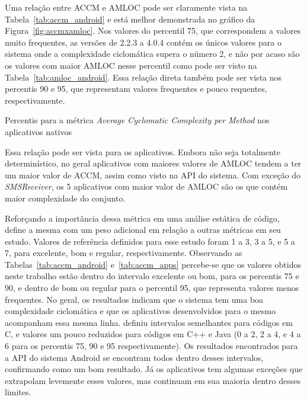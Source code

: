 Uma relação entre ACCM e AMLOC pode ser claramente vista na Tabela~\ref{tab:accm_android} e está melhor demonstrada no gráfico da Figura~\ref{fig:accmxamloc}. Nos valores do percentil 75, que correspondem a valores muito frequentes, as versões de 2.2.3 a 4.0.4 contém os únicos valores para o sistema onde a complexidade ciclomática supera o número 2, e não por acaso são os valores com maior AMLOC nesse percentil como pode ser visto na Tabela~\ref{tab:amloc_android}. Essa relação direta também pode ser vista nos percentis 90 e 95, que representam valores frequentes e pouco requentes, respectivamente.

\begin{table}[!htb]
\centering
{}

\caption{Percentis para a métrica \textit{Average Cyclomatic Complexity per Method} nos aplicativos nativos}
\label{tab:accm_apps}
\end{table}

Essa relação pode ser vista para os aplicativos. Embora não seja totalmente determinístico, no geral aplicativos com maiores valores de AMLOC tendem a ter um maior valor de ACCM, assim como visto na API do sistema. Com exceção do \textit{SMSReceiver}, os 5 aplicativos com maior valor de AMLOC são os que contém maior complexidade do conjunto. 

Reforçando a importância dessa métrica em uma análise estática de código,  define a mesma com um peso adicional em relação a outras métricas em seu estudo. Valores de referência definidos para esse estudo foram 1 a 3, 3 a 5, e 5 a 7, para excelente, bom e regular, respectivamente. Observando as Tabelas~\ref{tab:accm_android} e~\ref{tab:accm_apps} percebe-se que os valores obtidos neste trabalho estão dentro do intervalo excelente ou bom, para os percentis 75 e 90, e dentro de bom ou regular para o percentil 95, que representa valores menos frequentes. No geral, os resultados indicam que o sistema tem uma boa complexidade ciclomática e que os aplicativos desenvolvidos para o mesmo acompanham essa mesma linha.  definiu intervalos semelhantes para códigos em C, e valores um pouco reduzidos para códigos em C++ e Java (0 a 2, 2 a 4, e 4 a 6 para os percentis 75, 90 e 95 respectivamente).  Os resultados encontrados para a API do sistema Android se encontram todos dentro desses intervalos, confirmando como um bom resultado. Já os aplicativos tem algumas exceções que extrapolam levemente esses valores, mas continuam em sua maioria dentro desses limites.


